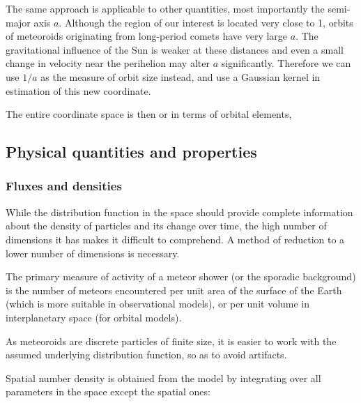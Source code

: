             The same approach is applicable to other quantities, most importantly the semi-major axis $a$.
            Although the region of our interest is located very close to \SI{1}{\au},
            orbits of meteoroids originating from long-period comets have very large $a$.
            The gravitational influence of the Sun is weaker at these distances and
            even a small change in velocity near the perihelion may alter $a$ significantly.
            Therefore we can use $1/a$ as the measure of orbit size instead,
            and use a Gaussian kernel in estimation of this new coordinate.

            The entire coordinate space is then
            or in terms of orbital elements,

    \subsection{Physical quantities and properties} \label{mp}
        \subsubsection{Fluxes and densities} \label{msmf}
            While the distribution function in the space should provide complete information
            about the density of particles and its change over time,
            the high number of dimensions it has makes it difficult to comprehend.
            A method of reduction to a lower number of dimensions is necessary.

            The primary measure of activity of a meteor shower (or the sporadic background) is the number
            of meteors encountered per unit area of the surface of the Earth (which is more suitable
            in observational models), or per unit volume in interplanetary space (for orbital models).

            As meteoroids are discrete particles of finite size, it is easier to work with the
            assumed underlying distribution function, so as to avoid artifacts.

            Spatial number density is obtained from the model by integrating over all parameters
            in the space except the spatial ones:

